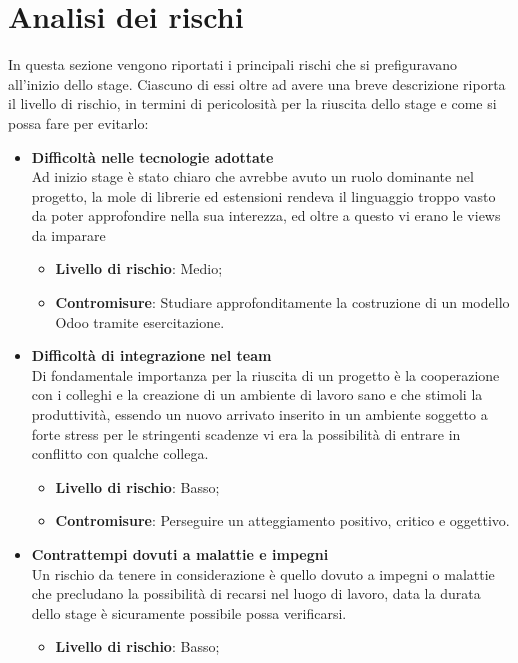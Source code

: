 \section{Analisi dei rischi}
In questa sezione vengono riportati i principali rischi che si prefiguravano all'inizio dello stage. Ciascuno di essi oltre ad avere una breve descrizione riporta il livello di rischio, in termini di pericolosità per la riuscita dello stage e come si possa fare per evitarlo:
\begin{itemize}
	\item \textbf{Difficoltà nelle tecnologie adottate}\\
	      Ad inizio stage è stato chiaro che  avrebbe avuto un ruolo dominante nel progetto, la mole di librerie ed estensioni rendeva il linguaggio troppo vasto da poter approfondire nella sua interezza, ed oltre a questo vi erano le views da imparare
	      \begin{itemize}
	      	\item \textbf{Livello di rischio}: Medio;
	      	\item \textbf{Contromisure}: Studiare approfonditamente la costruzione di un modello Odoo tramite esercitazione.
	      \end{itemize}
	\item \textbf{Difficoltà di integrazione nel team}\\
	      Di fondamentale importanza per la riuscita di un progetto è la cooperazione con i colleghi e la creazione di un ambiente di lavoro sano e che stimoli la produttività, essendo un nuovo arrivato inserito in un ambiente soggetto a forte stress per le stringenti scadenze vi era la possibilità di entrare in conflitto con qualche collega.
	      \begin{itemize}
	      	\item \textbf{Livello di rischio}: Basso;
	      	\item \textbf{Contromisure}: Perseguire un atteggiamento positivo, critico e oggettivo.
	      \end{itemize}
	\item \textbf{Contrattempi dovuti a malattie e impegni}\\
	      Un rischio da tenere in considerazione è quello dovuto a impegni o malattie che precludano la possibilità di recarsi nel luogo di lavoro, data la durata dello stage è sicuramente possibile possa verificarsi.
	      \begin{itemize}
	      	\item \textbf{Livello di rischio}: Basso;

\end{itemize}
\end{itemize}
